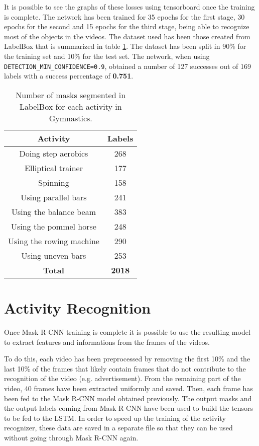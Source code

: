 \documentclass[12pt]{article}
\numberwithin{equation}{section} %
\numberwithin{figure}{section} %
\numberwithin{table}{section} %
\theoremstyle{definition}
\begin{document}
It is possible to see the graphs of these losses using
tensorboard once the
training is complete. The network has been trained for 35
epochs for the first stage, 30 epochs for the second and
15 epochs for the third stage, being able to recognize most
of the objects in the videos. The dataset used has been those
created from LabelBox that is summarized in table
\ref{table:labelbox-masks-summary}. The dataset has been
split in 90\% for the training set and 10\% for the test set.
The network, when using \texttt{DETECTION\_MIN\_CONFIDENCE=0.9},
obtained a number of 127 successes out of 169
labels with a success percentage of \textbf{0.751}.

\begin{table}
	\centering
	\begin{tabular}{*{2}{c}}
		Activity & Labels \\
		\hline
		Doing step aerobics & 268 \\
		Elliptical trainer & 177 \\
		Spinning & 158 \\
		Using parallel bars & 241 \\
		Using the balance beam & 383 \\
		Using the pommel horse & 248 \\
		Using the rowing machine & 290 \\
		Using uneven bars & 253 \\
		\hline
		\textbf{Total} & \textbf{2018}
	\end{tabular}
	\caption{Number of masks segmented in LabelBox for
	    each activity in Gymnastics.}
	\label{table:labelbox-masks-summary}
\end{table}


\section{Activity Recognition}

Once Mask R-CNN training is complete it is possible to 
use the resulting model to extract features and informations
from the frames of the videos.

To do this, each video has been preprocessed by removing the
first 10\% and the last 10\% of the frames that likely contain
frames that do not contribute to the recognition of the video
(e.g. advertisement). From the remaining part of the video,
40 frames have been extracted uniformly and saved.
Then, each frame has been fed to the Mask R-CNN model obtained
previously. The output masks and the output labels coming
from Mask R-CNN have been
used to build the tensors to be fed to the LSTM. In order
to speed up the training of the activity recognizer, these
data are saved in a separate file so that they can be used 
without going through Mask R-CNN again.
\end{document}
